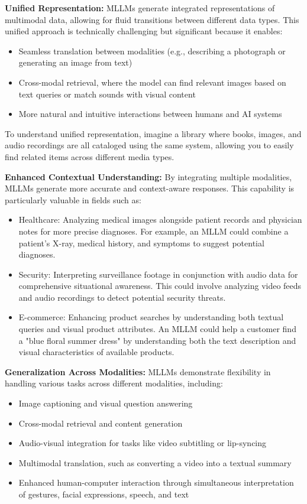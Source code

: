 \textbf{Unified Representation:} MLLMs generate integrated representations of multimodal data, allowing for fluid transitions between different data types. This unified approach is technically challenging but significant because it enables:

\begin{itemize}
    \item Seamless translation between modalities (e.g., describing a photograph or generating an image from text)
    \item Cross-modal retrieval, where the model can find relevant images based on text queries or match sounds with visual content
    \item More natural and intuitive interactions between humans and AI systems
\end{itemize}

To understand unified representation, imagine a library where books, images, and audio recordings are all cataloged using the same system, allowing you to easily find related items across different media types.

\textbf{Enhanced Contextual Understanding:} By integrating multiple modalities, MLLMs generate more accurate and context-aware responses. This capability is particularly valuable in fields such as:

\begin{itemize}
    \item Healthcare: Analyzing medical images alongside patient records and physician notes for more precise diagnoses. For example, an MLLM could combine a patient's X-ray, medical history, and symptoms to suggest potential diagnoses.
    \item Security: Interpreting surveillance footage in conjunction with audio data for comprehensive situational awareness. This could involve analyzing video feeds and audio recordings to detect potential security threats.
    \item E-commerce: Enhancing product searches by understanding both textual queries and visual product attributes. An MLLM could help a customer find a "blue floral summer dress" by understanding both the text description and visual characteristics of available products.
\end{itemize}

\textbf{Generalization Across Modalities:} MLLMs demonstrate flexibility in handling various tasks across different modalities, including:

\begin{itemize}
    \item Image captioning and visual question answering
    \item Cross-modal retrieval and content generation
    \item Audio-visual integration for tasks like video subtitling or lip-syncing
    \item Multimodal translation, such as converting a video into a textual summary
    \item Enhanced human-computer interaction through simultaneous interpretation of gestures, facial expressions, speech, and text
\end{itemize}

